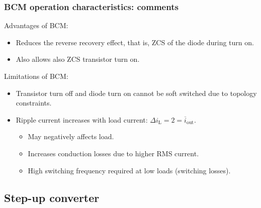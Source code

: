 \begin{frame}
    \frametitle{BCM operation characteristics: comments}
   Advantages of BCM:
   \begin{itemize}
        \item Reduces the reverse recovery effect, that is, ZCS of the diode during turn on.
        \item Also allows also ZCS transistor turn on.  
   \end{itemize}
   \vspace{1em}
   Limitations of BCM:
    \begin{itemize}
          \item Transistor turn off and diode turn on cannot be soft switched due to topology constraints.
          \item Ripple current increases with load current: $ \Delta i_\mathrm{L} = 2=\overline{i}_\mathrm{out}$.
          \begin{itemize}
            \item May negatively affects load.
            \item Increases conduction losses due to higher RMS current.
            \item High switching frequency required at low loads (switching losses).
          \end{itemize}
    \end{itemize}
\end{frame}

\subsection{Step-up converter}


